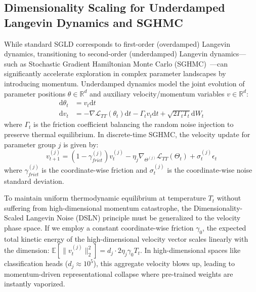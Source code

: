 \documentclass{article}
\theoremstyle{plain}
\theoremstyle{definition}
\theoremstyle{remark}
\begin{document}
\subsection{Dimensionality Scaling for Underdamped Langevin Dynamics and SGHMC}
While standard SGLD corresponds to first-order (overdamped) Langevin dynamics, transitioning to second-order (underdamped) Langevin dynamics—such as Stochastic Gradient Hamiltonian Monte Carlo (SGHMC)~\cite{chen2014stochastic}—can significantly accelerate exploration in complex parameter landscapes by introducing momentum. Underdamped dynamics model the joint evolution of parameter positions $\theta \in \mathbb{R}^d$ and auxiliary velocity/momentum variables $v \in \mathbb{R}^d$:
\begin{align}
    \text{d}\theta_t &= v_t \text{d}t \\
    \text{d}v_t &= -\nabla \mathcal{L}_{TT}(\theta_t)\text{d}t - \Gamma_t v_t\text{d}t + \sqrt{2 \Gamma_t T_t} \text{d}W_t
\end{align}
where $\Gamma_t$ is the friction coefficient balancing the random noise injection to preserve thermal equilibrium. In discrete-time SGHMC, the velocity update for parameter group $j$ is given by:
\begin{equation}
    v_{t+1}^{(j)} = (1 - \gamma_{frict}^{(j)}) v_t^{(j)} - \eta_j \nabla_{\Theta^{(j)}} \mathcal{L}_{TT}(\Theta_t) + \sigma_t^{(j)} \epsilon_t
\end{equation}
where $\gamma_{frict}^{(j)}$ is the coordinate-wise friction and $\sigma_t^{(j)}$ is the coordinate-wise noise standard deviation.

To maintain uniform thermodynamic equilibrium at temperature $T_t$ without suffering from high-dimensional momentum catastrophe, the Dimensionality-Scaled Langevin Noise (DSLN) principle must be generalized to the velocity phase space. If we employ a constant coordinate-wise friction $\gamma_0$, the expected total kinetic energy of the high-dimensional velocity vector scales linearly with the dimension: $\mathbb{E}[\|v_t^{(j)}\|_2^2] = d_j \cdot 2 \eta_j \gamma_0 T_t$. In high-dimensional spaces like classification heads ($d_j \approx 10^5$), this aggregate velocity blows up, leading to momentum-driven representational collapse where pre-trained weights are instantly vaporized.
\end{document}
